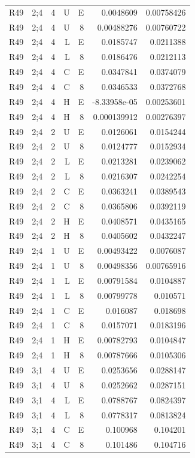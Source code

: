{\begin{longtable}{@{}llrrrrr@{}}
R49 & 2;4 & 4 & U & E & 0.0048609 & 0.00758426 \\
R49 & 2;4 & 4 & U & 8 & 0.00488276 & 0.00760722 \\
R49 & 2;4 & 4 & L & E & 0.0185747 & 0.0211388 \\
R49 & 2;4 & 4 & L & 8 & 0.0186476 & 0.0212113 \\
R49 & 2;4 & 4 & C & E & 0.0347841 & 0.0374079 \\
R49 & 2;4 & 4 & C & 8 & 0.0346533 & 0.0372768 \\
R49 & 2;4 & 4 & H & E & -8.33958e-05 & 0.00253601 \\
R49 & 2;4 & 4 & H & 8 & 0.000139912 & 0.00276397 \\
R49 & 2;4 & 2 & U & E & 0.0126061 & 0.0154244 \\
R49 & 2;4 & 2 & U & 8 & 0.0124777 & 0.0152934 \\
R49 & 2;4 & 2 & L & E & 0.0213281 & 0.0239062 \\
R49 & 2;4 & 2 & L & 8 & 0.0216307 & 0.0242254 \\
R49 & 2;4 & 2 & C & E & 0.0363241 & 0.0389543 \\
R49 & 2;4 & 2 & C & 8 & 0.0365806 & 0.0392119 \\
R49 & 2;4 & 2 & H & E & 0.0408571 & 0.0435165 \\
R49 & 2;4 & 2 & H & 8 & 0.0405602 & 0.0432247 \\
R49 & 2;4 & 1 & U & E & 0.00493422 & 0.0076087 \\
R49 & 2;4 & 1 & U & 8 & 0.00498356 & 0.00765916 \\
R49 & 2;4 & 1 & L & E & 0.00791584 & 0.0104887 \\
R49 & 2;4 & 1 & L & 8 & 0.00799778 & 0.010571 \\
R49 & 2;4 & 1 & C & E & 0.016087 & 0.018698 \\
R49 & 2;4 & 1 & C & 8 & 0.0157071 & 0.0183196 \\
R49 & 2;4 & 1 & H & E & 0.00782793 & 0.0104847 \\
R49 & 2;4 & 1 & H & 8 & 0.00787666 & 0.0105306 \\
R49 & 3;1 & 4 & U & E & 0.0253656 & 0.0288147 \\
R49 & 3;1 & 4 & U & 8 & 0.0252662 & 0.0287151 \\
R49 & 3;1 & 4 & L & E & 0.0788767 & 0.0824397 \\
R49 & 3;1 & 4 & L & 8 & 0.0778317 & 0.0813824 \\
R49 & 3;1 & 4 & C & E & 0.100968 & 0.104201 \\
R49 & 3;1 & 4 & C & 8 & 0.101486 & 0.104716 \\

\end{longtable}}
